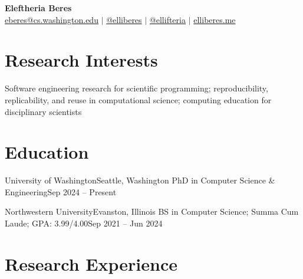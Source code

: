 \documentclass{resume}
\begin{document}

\begin{center}
    \textbf{\Huge \bfseries Eleftheria Beres} \\ \vspace{3pt}
    \small
    \faEnvelopeO \hspace{.5pt} \href{mailto:eberes@cs.washington.edu}{eberes@cs.washington.edu}
    $|$
    \faLinkedinSquare \hspace{.5pt} \href{https://www.linkedin.com/in/elliberes}{@elliberes}
    $|$
    \faGithub \hspace{.5pt} \href{https://github.com/ellifteria}{@ellifteria}
    $|$
    \faGlobe \hspace{.5pt} \href{https://elliberes.me}{elliberes.me}
\end{center}

\section{Research Interests}
  \vspace{3pt}
  \resumeSubHeadingListStart
    \small{\item{
        
        Software engineering research for scientific programming; reproducibility, replicability, and reuse in computational science; computing education for disciplinary scientists \\ \vspace{3pt}
        
    }}
  \resumeSubHeadingListEnd


\section{Education}
  \vspace{3pt}
  \resumeSubHeadingListStart
   \resumeEducationHeading
      {University of Washington}{Seattle, Washington}
      {PhD in Computer Science \& Engineering}{Sep 2024 – Present}

    \resumeEducationHeading
      {Northwestern University}{Evanston, Illinois}
      {BS in Computer Science; Summa Cum Laude; GPA: 3.99/4.00}{Sep 2021 – Jun 2024}
    
  \resumeSubHeadingListEnd



\section{Research Experience}
  \vspace{3pt}
  \resumeSubHeadingListStart
\end{document}
